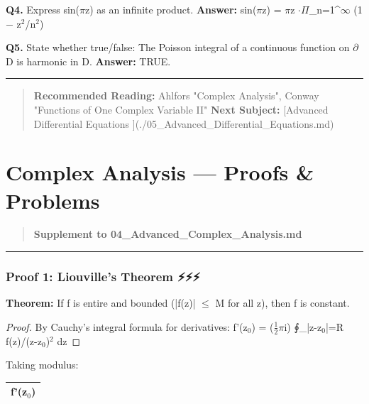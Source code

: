 \documentclass[12pt,a4paper,openany]{book}
\begin{document}
{{\textbf{Q4.} Express sin($\pi$z) as an infinite product.
\textbf{Answer:} sin($\pi$z) = $\pi$z $\cdot\Pi$_{n=1}^$\infty$ (1 − z$^2$/n$^2$)

\textbf{Q5.} State whether true/false: The Poisson integral of a continuous function on $\partial$D is harmonic in D.
\textbf{Answer:} TRUE.

\bigskip\noindent\rule{\textwidth}{0.4pt}\bigskip

\begin{quote}
\textbf{ Recommended Reading:} Ahlfors "Complex Analysis", Conway "Functions of One Complex Variable II"
\textbf{Next Subject:} [Advanced Differential Equations ](./05_Advanced_Differential_Equations.md)
\end{quote}

\newpage

\chapter{Complex Analysis --- Proofs \& Problems}


\begin{quote}
\textbf{Supplement to 04_Advanced_Complex_Analysis.md}
\end{quote}

\bigskip\noindent\rule{\textwidth}{0.4pt}\bigskip


\subsection{Proof 1: Liouville's Theorem ⚡⚡⚡}

\begin{tcolorbox}[colback=lightblue,colframe=thmblue,title=\textbf{Theorem},breakable,boxrule=1.5pt]
\textbf{Theorem:} If f is entire and bounded (|f(z)| $\leq$ M for all z), then f is constant.
\end{tcolorbox}

\begin{proof}

By Cauchy's integral formula for derivatives:
f'(z$_0$) = ($\frac{1}{2}$$\pi$i) ∮_{|z-z$_0$|=R} f(z)/(z-z$_0$)$^2$ dz
\end{proof}

Taking modulus:
\begin{center}
\begin{tabular}{|l|}
\hline
\textbf{f'(z$_0$)} \\
\hline
\end{tabular}
\end{center}

}}
\end{document}
